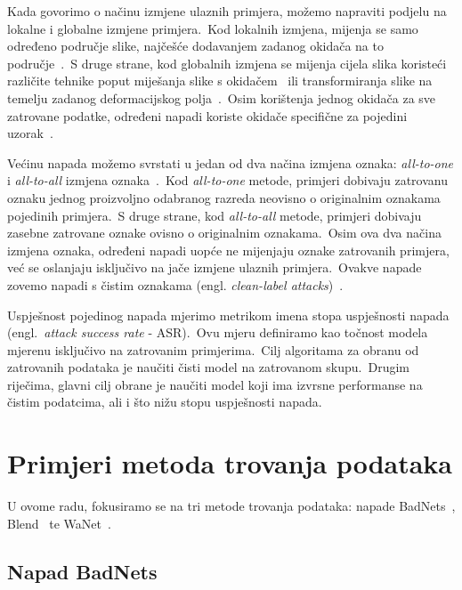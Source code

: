 \documentclass[diplomskirad]{fer}
\begin{document}
Kada govorimo o načinu izmjene ulaznih primjera, možemo napraviti podjelu na lokalne i globalne izmjene primjera.\ Kod lokalnih izmjena, mijenja se samo određeno područje slike, najčešće dodavanjem zadanog okidača na to područje~\cite{gu2019badnets}.\ 
S druge strane, kod globalnih izmjena se mijenja cijela slika koristeći različite tehnike poput miješanja slike s okidačem~\cite{chen2020backdoor} ili transformiranja slike na temelju zadanog deformacijskog polja~\cite{nguyen2021wanet}.\ 
Osim korištenja jednog okidača za sve zatrovane podatke, određeni napadi koriste okidače specifične za pojedini uzorak~\cite{li2021invisible}.\
  
Većinu napada možemo svrstati u jedan od dva načina izmjena oznaka: \textit{all-to-one} i \textit{all-to-all} izmjena oznaka~\cite{doan2022marksman}.\ 
Kod \textit{all-to-one} metode, primjeri dobivaju zatrovanu oznaku jednog proizvoljno odabranog razreda neovisno o originalnim oznakama pojedinih primjera.\ 
S druge strane, kod \textit{all-to-all} metode, primjeri dobivaju zasebne zatrovane oznake ovisno o originalnim oznakama.\ 
Osim ova dva načina izmjena oznaka, određeni napadi uopće ne mijenjaju oznake zatrovanih primjera, već se oslanjaju isključivo na jače izmjene ulaznih primjera.\ Ovakve napade zovemo napadi s čistim oznakama (engl. \textit{clean-label attacks})~\cite{barni2019new}.\
  
Uspješnost pojedinog napada mjerimo metrikom imena stopa uspješnosti napada (engl.\ \textit{attack success rate} - ASR).\ Ovu mjeru definiramo kao točnost modela mjerenu isključivo na zatrovanim primjerima.\ 
Cilj algoritama za obranu od zatrovanih podataka je naučiti čisti model na zatrovanom skupu.\ Drugim riječima, glavni cilj obrane je naučiti model koji ima izvrsne performanse na čistim podatcima, ali i što nižu stopu uspješnosti napada.\ 

\section{Primjeri metoda trovanja podataka}
\label{sek:primjeri_trovanja}

U ovome radu, fokusiramo se na tri metode trovanja podataka: napade BadNets~\cite{gu2019badnets}, Blend~\cite{chen2020backdoor} te WaNet~\cite{nguyen2021wanet}.\
  
\subsection{Napad BadNets}
\label{sub:badnets}
\end{document}
